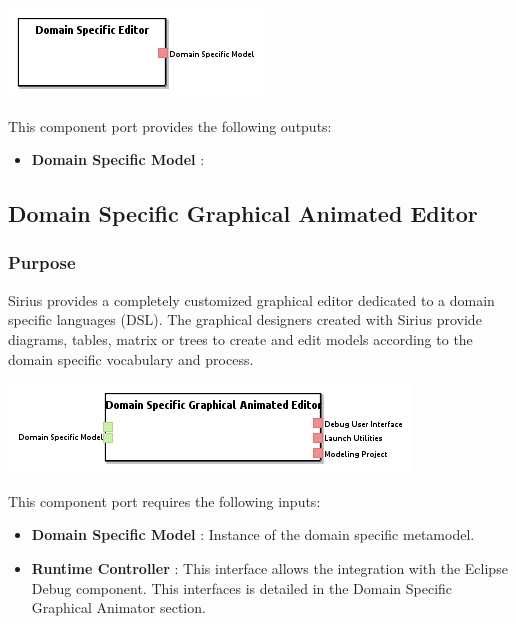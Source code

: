 \documentclass{gemoc} %
\begin{document}
\begin{center}
\includegraphics*[trim=0.0cm 0.0cm 0cm 0.0cm, clip=true]{../images/generated/Generated_Domain_Specific_Editor.png}
\end{center}


This component port provides the following outputs:
\begin{itemize}
  \item \textbf{Domain Specific Model} :
\end{itemize}


\subsection{Domain Specific Graphical Animated Editor}


\subsubsection{Purpose}
Sirius provides a completely customized graphical editor dedicated to a domain specific languages (DSL). The graphical designers created with Sirius
provide diagrams, tables, matrix or trees to create and edit models according to the domain specific vocabulary and process.

\begin{center}
\includegraphics*[trim=0.0cm 0.0cm 0cm 0.0cm, clip=true]{../images/generated/Generated_Domain_Specific_Graphical_Animated_Editor.png}
\end{center}

This component port requires the following inputs:
\begin{itemize}
  \item \textbf{Domain Specific Model} :
Instance of the domain specific metamodel.
  \item \textbf{Runtime Controller} :
This interface allows the integration with the Eclipse Debug component. This interfaces is detailed in the Domain Specific Graphical Animator section.
\end{itemize}
\end{document}
